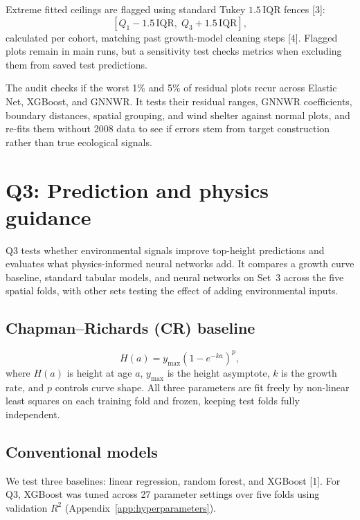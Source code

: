 \documentclass[logo,msc,ai]{infthesis}           %
\begin{document}
Extreme fitted ceilings are flagged using standard Tukey $1.5\,\mathrm{IQR}$ fences [3]:
\begin{equation}
\left[Q_1 - 1.5\,\mathrm{IQR},\; Q_3 + 1.5\,\mathrm{IQR}\right],
\label{eq:tukey-fences}
\end{equation}
calculated per cohort, matching past growth-model cleaning steps [4]. Flagged plots remain in main runs, but a sensitivity test checks metrics when excluding them from saved test predictions.

The audit checks if the worst 1\% and 5\% of residual plots recur across Elastic Net, XGBoost, and GNNWR. It tests their residual ranges, GNNWR coefficients, boundary distances, spatial grouping, and wind shelter against normal plots, and re-fits them without 2008 data to see if errors stem from target construction rather than true ecological signals.

\section{Q3: Prediction and physics guidance}

Q3 tests whether environmental signals improve top-height predictions and evaluates what physics-informed neural networks add. It compares a growth curve baseline, standard tabular models, and neural networks on Set~3 across the five spatial folds, with other sets testing the effect of adding environmental inputs.

\subsection{Chapman--Richards (CR) baseline}
\begin{equation}
H(a) = y_{\max}\left(1 - e^{-ka}\right)^p,
\label{eq:cr}
\end{equation}
where $H(a)$ is height at age $a$, $y_{\max}$ is the height asymptote, $k$ is the growth rate, and $p$ controls curve shape. All three parameters are fit freely by non-linear least squares on each training fold and frozen, keeping test folds fully independent.

\subsection*{Conventional models}
We test three baselines: linear regression, random forest, and XGBoost [1]. For Q3, XGBoost was tuned across 27 parameter settings over five folds using validation $R^2$ (Appendix~\ref{app:hyperparameters}).
\end{document}
